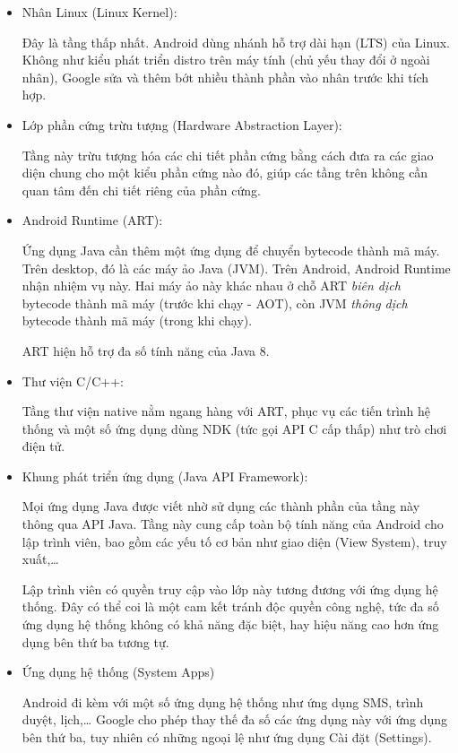 \documentclass[../../thesis]{subfiles}
\begin{document}
\begin{itemize}
    \item
        Nhân Linux (Linux Kernel):

        Đây là tầng thấp nhất. Android dùng nhánh hỗ trợ dài hạn (LTS) của
        Linux. Không như kiểu phát triển distro trên máy tính (chủ yếu thay đổi
        ở ngoài nhân), Google sửa và thêm bớt nhiều thành phần vào nhân trước
        khi tích hợp.
    \item
        Lớp phần cứng trừu tượng (Hardware Abstraction Layer):

        Tầng này trừu tượng hóa các chi tiết phần cứng bằng cách đưa ra các giao
        diện chung cho một kiểu phần cứng nào đó, giúp các tầng trên không cần
        quan tâm đến chi tiết riêng của phần cứng.

    \item
        Android Runtime (ART):

        Ứng dụng Java cần thêm một ứng dụng để chuyển bytecode thành mã máy.
        Trên desktop, đó là các máy ảo Java (JVM). Trên Android, Android Runtime
        nhận nhiệm vụ này. Hai máy ảo này khác nhau ở chỗ ART \emph{biên dịch}
        bytecode thành mã máy (trước khi chạy - AOT), còn JVM \emph{thông dịch}
        bytecode thành mã máy (trong khi chạy).

        ART hiện hỗ trợ đa số tính năng của Java 8.
\end{itemize}

\begin{itemize}[resume, before = \vspace*{-\dimexpr\topsep+\partopsep\relax}]
    \item
        Thư viện C/C++:

        Tầng thư viện native nằm ngang hàng với ART, phục vụ các tiến trình hệ
        thống và một số ứng dụng dùng NDK (tức gọi API C cấp thấp) như trò chơi
        điện tử.
    \item
        Khung phát triển ứng dụng (Java API Framework):

        Mọi ứng dụng Java được viết nhờ sử dụng các thành phần của tầng này
        thông qua API Java. Tầng này cung cấp toàn bộ tính năng của Android cho
        lập trình viên, bao gồm các yếu tố cơ bản như giao diện (View System),
        truy xuất,\ldots{}

        Lập trình viên có quyền truy cập vào lớp này tương đương với ứng dụng hệ
        thống. Đây có thể coi là một cam kết tránh độc quyền công nghệ, tức đa
        số ứng dụng hệ thống không có khả năng đặc biệt, hay hiệu năng cao hơn
        ứng dụng bên thứ ba tương tự.
    \item
        Ứng dụng hệ thống (System Apps)

        Android đi kèm với một số ứng dụng hệ thống như ứng dụng SMS, trình
        duyệt, lịch,\ldots{} Google cho phép thay thế đa số các ứng dụng này với
        ứng dụng bên thứ ba, tuy nhiên có những ngoại lệ như ứng dụng Cài đặt
        (Settings).
\end{itemize}
\end{document}
